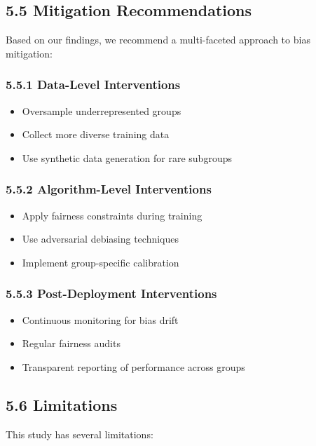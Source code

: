 \documentclass[12pt,a4paper]{article}
\begin{document}
\subsection{5.5 Mitigation Recommendations}

Based on our findings, we recommend a multi-faceted approach to bias mitigation:

\subsubsection{5.5.1 Data-Level Interventions}
\begin{itemize}
    \item Oversample underrepresented groups
    \item Collect more diverse training data
    \item Use synthetic data generation for rare subgroups
\end{itemize}

\subsubsection{5.5.2 Algorithm-Level Interventions}
\begin{itemize}
    \item Apply fairness constraints during training
    \item Use adversarial debiasing techniques
    \item Implement group-specific calibration
\end{itemize}

\subsubsection{5.5.3 Post-Deployment Interventions}
\begin{itemize}
    \item Continuous monitoring for bias drift
    \item Regular fairness audits
    \item Transparent reporting of performance across groups
\end{itemize}

\subsection{5.6 Limitations}

This study has several limitations:
\end{document}
